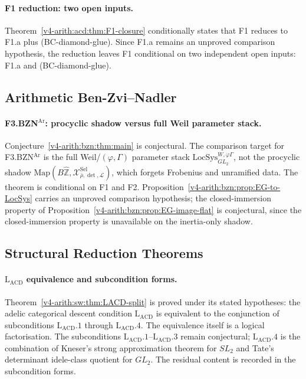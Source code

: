 \paragraph{F1 reduction: two open inputs.}
Theorem~\ref{v4-arith:acd:thm:F1-closure} conditionally states that F1 reduces to F1.a
plus (BC-diamond-glue). Since F1.a remains
an unproved comparison hypothesis, the reduction leaves F1 conditional
on two independent open inputs: F1.a and (BC-diamond-glue).

\subsection{Arithmetic Ben-Zvi--Nadler}
\label{v4-arith:w3-comparison-A:ch28}

\paragraph{F3.BZN\({}^{\mathrm{Ar}}\): procyclic shadow versus full Weil parameter stack.}
Conjecture~\ref{v4-arith:bzn:thm:main} is conjectural.
The comparison target for F3.BZN\({}^{\mathrm{Ar}}\) is the full
Weil/\((\varphi,\Gamma)\) parameter stack
\(\mathrm{LocSys}^{W,\varphi\Gamma}_{GL_{2}}\), not the procyclic
shadow
\(\mathrm{Map}(B\widehat{\mathbb{Z}},\mathcal{X}^{\mathrm{Sel}}_{\bar\rho,\det,\mathcal{L}})\),
which forgets Frobenius and unramified data. The theorem is
conditional on F1 and F2. Proposition~\ref{v4-arith:bzn:prop:EG-to-LocSys}
carries an unproved comparison hypothesis; the closed-immersion
property of Proposition~\ref{v4-arith:bzn:prop:EG-image-flat} is
conjectural, since the closed-immersion property is
unavailable on the inertia-only shadow.

\subsection{Structural Reduction Theorems}
\label{v4-arith:w3-comparison-A:ch30}

\paragraph{\(\mathrm{L}_{\mathrm{ACD}}\) equivalence and subcondition forms.}
Theorem~\ref{v4-arith:sw:thm:LACD-split} is proved under its stated hypotheses: the
adelic categorical descent condition \(\mathrm{L}_{\mathrm{ACD}}\) is
equivalent to the conjunction of subconditions
\(\mathrm{L}_{\mathrm{ACD}}.1\) through \(\mathrm{L}_{\mathrm{ACD}}.4\).
The equivalence itself is a logical factorisation. The subconditions
\(\mathrm{L}_{\mathrm{ACD}}.1\)--\(\mathrm{L}_{\mathrm{ACD}}.3\) remain
conjectural; \(\mathrm{L}_{\mathrm{ACD}}.4\) is the
combination of Kneser's strong approximation theorem for \(SL_{2}\)
and Tate's determinant idele-class quotient for \(GL_{2}\). The
residual content is recorded in the
subcondition forms.

